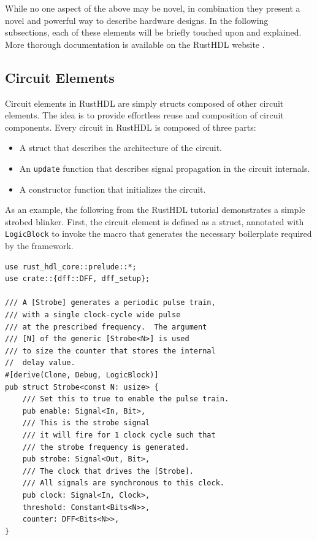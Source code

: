 \documentclass[conference]{IEEEtran}
\begin{document}
While no one aspect of the above may be novel, in combination they present a 
novel and powerful way to describe hardware designs.  In the following subsections, each of these 
elements will be briefly touched upon and explained.  More thorough documentation is available on the
RustHDL website \cite{b6}.

\subsection{Circuit Elements}

Circuit elements in RustHDL are simply structs composed of other circuit elements.  The idea is to
provide effortless reuse and composition of circuit components.  Every circuit in RustHDL is composed
of three parts:
\begin{itemize}
  \item A struct that describes the architecture of the circuit.
  \item An \verb|update| function that describes signal propagation in the circuit internals.
  \item A constructor function that initializes the circuit.
\end{itemize}

As an example, the following from the RustHDL tutorial demonstrates a simple strobed blinker.  First, the
circuit element is defined as a struct, annotated with \verb|LogicBlock| to invoke the macro that generates
the necessary boilerplate required by the framework.

\begin{verbatim}
use rust_hdl_core::prelude::*;
use crate::{dff::DFF, dff_setup};

/// A [Strobe] generates a periodic pulse train, 
/// with a single clock-cycle wide pulse
/// at the prescribed frequency.  The argument 
/// [N] of the generic [Strobe<N>] is used
/// to size the counter that stores the internal 
//  delay value.  
#[derive(Clone, Debug, LogicBlock)]
pub struct Strobe<const N: usize> {
    /// Set this to true to enable the pulse train.
    pub enable: Signal<In, Bit>,
    /// This is the strobe signal 
    /// it will fire for 1 clock cycle such that 
    /// the strobe frequency is generated.
    pub strobe: Signal<Out, Bit>,
    /// The clock that drives the [Strobe].  
    /// All signals are synchronous to this clock.
    pub clock: Signal<In, Clock>,
    threshold: Constant<Bits<N>>,
    counter: DFF<Bits<N>>,
}
\end{verbatim}
\end{document}
